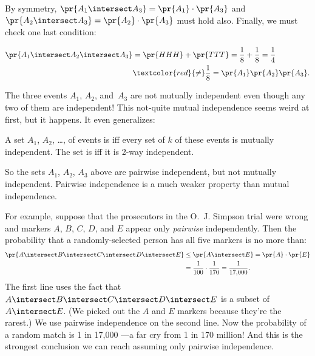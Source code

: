 By symmetry, $\pr{A_1 \intersect A_3} = \pr{A_1} \cdot \pr{A_3}$ and
$\pr{A_2 \intersect A_3} = \pr{A_2} \cdot \pr{A_3}$ must hold also.
Finally, we must check one last condition:

\begin{align*}
\pr{A_1 \intersect A_2 \intersect A_3}
        & = \pr{HHH} + \pr{TTT}
          = \frac{1}{8} + \frac{1}{8}
          = \frac{1}{4}\\
        & \textcolor{red}{\mathbf{\neq}} \frac{1}{8} = \pr{A_1} \pr{A_2} \pr{A_3}.
\end{align*}


\iffalse
\begin{align*}
\pr{A_1 \intersect A_2 \intersect A_3}      & = \pr{HHH} + \pr{TTT} \\[2pt]
                                & = \frac{1}{8} + \frac{1}{8} \\[2pt]
                                & = \frac{1}{4} \\[2pt]
                                & \neq \pr{A_1} \pr{A_2} \pr{A_3} = \frac{1}{8}.
\end{align*}
\fi
%
The three events $A_1$, $A_2$, and~$A_3$ are not mutually independent
even though any two of them are independent!  This not-quite mutual
independence seems weird at first, but it happens.  It even
generalizes:

\begin{definition}\label{kway_independent_events}
  A set $A_1$, $A_2$, \dots, of events is 
  iff every set of $k$ of these events is mutually independent.  The
  set is  iff it is 2-way independent.
\end{definition}

So the sets $A_1$, $A_2$, $A_3$ above are pairwise independent, but
not mutually independent.  Pairwise independence is a much weaker
property than mutual independence.

For example, suppose that the prosecutors in the O.~J. Simpson trial
were wrong and markers $A$, $B$, $C$, $D$, and $E$ appear only
\emph{pairwise} independently.  Then the probability that a
randomly-selected person has all five markers is no more than:
%
\begin{align*}
\pr{A \intersect B \intersect C \intersect D \intersect E}
    & \leq \pr{A \intersect E} = \pr{A} \cdot \pr{E}\\
    & = \frac{1}{100} \cdot \frac{1}{170} = \frac{1}{17{,}000}.
\end{align*}
%
The first line uses the fact that $A \intersect B \intersect C \intersect
D \intersect E$ is a subset of $A \intersect E$.  (We picked out the $A$
and $E$ markers because they're the rarest.)  We use pairwise independence
on the second line.  Now the probability of a random match is 1 in
17,000 ---a far cry from 1 in 170 million!  And this is the strongest
conclusion we can reach assuming only pairwise independence.

